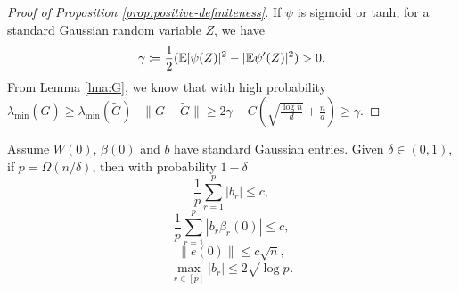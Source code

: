 \begin{proof}[Proof of Proposition \ref{prop:positive-definiteness}]
If $\psi$ is sigmoid or tanh, for a standard Gaussian random variable $Z$, we have
\begin{equation*}
    \gamma\defeq \frac{1}{2}(\E|\psi(Z)|^2-|\E\psi'(Z)|^2) >0.
\end{equation*}
From Lemma \ref{lma:G}, we know that with high probability $\lambda_{\min}(\overline{G}) \geq \lambda_{\min}(\widetilde{G})-\|\overline{G}-\widetilde{G}\|\geq 2\gamma - C(\sqrt{\frac{\log n}{d}} + \frac{n}{d}) \geq \gamma$.
\end{proof}

\begin{lemma}
\label{lma:inqs}
Assume $W(0)$, $\beta(0)$ and $b$ have \iid standard Gaussian entries. Given $\delta\in(0,1)$, if $p=\Omega(n/\delta)$, then with probability $1-\delta$
\begin{equation}\label{eq:sumb_bd}
    \frac{1}{p}\sum_{r=1}^p|b_r| \leq c,
\end{equation}
\begin{equation}\label{eq:sumbbet_bd}
    \frac{1}{p}\sum_{r=1}^p|b_r\beta_r(0)| \leq c,
\end{equation}
\begin{equation}\label{eq:e0_bd}
    \|e(0)\| \leq c\sqrt n,
\end{equation}
\begin{equation}\label{eq:maxb_bd}
    \max_{r\in[p]}|b_r|\leq 2\sqrt{\log p}.
\end{equation}
\end{lemma}
